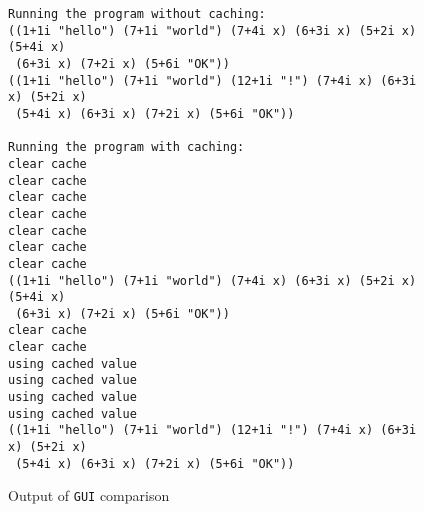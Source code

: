 \documentclass{article}
\newcommand{\code}[1]{\texttt{#1}}
\begin{document}
\begin{figure}
\caption{Output of \code{GUI} comparison}
\label{GUI-output}
\begin{verbatim}
Running the program without caching:
((1+1i "hello") (7+1i "world") (7+4i x) (6+3i x) (5+2i x) (5+4i x)
 (6+3i x) (7+2i x) (5+6i "OK"))
((1+1i "hello") (7+1i "world") (12+1i "!") (7+4i x) (6+3i x) (5+2i x)
 (5+4i x) (6+3i x) (7+2i x) (5+6i "OK"))

Running the program with caching:
clear cache
clear cache
clear cache
clear cache
clear cache
clear cache
clear cache
((1+1i "hello") (7+1i "world") (7+4i x) (6+3i x) (5+2i x) (5+4i x)
 (6+3i x) (7+2i x) (5+6i "OK"))
clear cache
clear cache
using cached value
using cached value
using cached value
using cached value
((1+1i "hello") (7+1i "world") (12+1i "!") (7+4i x) (6+3i x) (5+2i x)
 (5+4i x) (6+3i x) (7+2i x) (5+6i "OK"))
\end{verbatim}
\end{figure}
\end{document}
